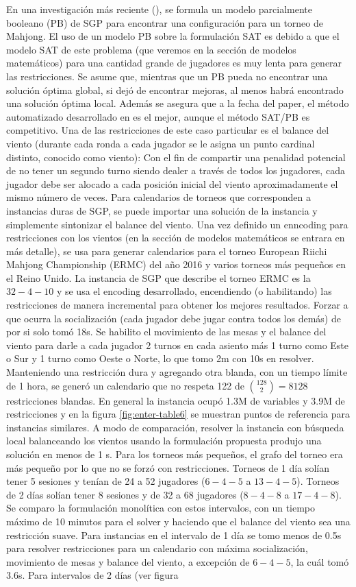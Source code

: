 \documentclass[letter, 10pt]{article}
\begin{document}
En una investigación más reciente (\cite{lester21pb}), se formula un modelo parcialmente booleano (PB) de SGP para encontrar una configuración para un torneo de Mahjong. El uso de un modelo PB sobre la formulación SAT es debido a que el modelo SAT de este problema (que veremos en la sección de modelos matemáticos) para una cantidad grande de jugadores es muy lenta para generar las restricciones. Se asume que, mientras que un PB pueda no encontrar una solución óptima global, si dejó de encontrar mejoras, al menos habrá encontrado una solución óptima local. Además se asegura que a la fecha del paper, el método automatizado desarrollado en \cite{triska2012effective} es el mejor, aunque el método SAT/PB es competitivo. Una de las restricciones de este caso particular es el balance del viento (durante cada ronda a cada jugador se le asigna un punto cardinal distinto, conocido como viento): Con el fin de compartir una penalidad potencial de no tener un segundo turno siendo dealer a través de todos los jugadores, cada jugador debe ser alocado a cada posición inicial del viento aproximadamente el mismo número de veces. Para calendarios de torneos que corresponden a instancias duras de SGP, se puede importar una solución de la instancia y simplemente sintonizar el balance del viento. Una vez definido un enncoding para restricciones con los vientos (en la sección de modelos matemáticos se entrara en más detalle), se usa para generar calendarios para el torneo European Riichi Mahjong Championship (ERMC) del año 2016 y varios torneos más pequeños en el Reino Unido. La instancia de SGP que describe el torneo ERMC es la $32-4-10$ y se usa el encoding desarrollado, encendiendo (o habilitando) las restricciones de manera incremental para obtener los mejores resultados. Forzar a que ocurra la socialización (cada jugador debe jugar contra todos los demás) de por si solo tomó 18s. Se habilito el movimiento de las mesas y el balance del viento para darle a cada jugador 2 turnos en cada asiento más 1 turno como Este o Sur y 1 turno como Oeste o Norte, lo que tomo 2m con 10s en resolver. Manteniendo una restricción dura y agregando otra blanda, con un tiempo límite de 1 hora, se generó un calendario que no respeta 122 de $\binom{128}{2}=8128$ restricciones blandas. En general la instancia ocupó 1.3M de variables y 3.9M de restricciones y en la figura \ref{fig:enter-table6} se muestran puntos de referencia para instancias similares. A modo de comparación, resolver la instancia con búsqueda local balanceando los vientos usando la formulación propuesta produjo una solución en menos de 1 s. Para los torneos más pequeños, el grafo del torneo era más pequeño por lo que no se forzó con restricciones. Torneos de 1 día solían tener 5 sesiones y tenían de 24 a 52 jugadores ($6-4-5$ a $13-4-5$). Torneos de 2 días solían tener 8 sesiones y de 32 a 68 jugadores ($8-4-8$ a $17-4-8$). Se comparo la formulación monolítica con estos intervalos, con un tiempo máximo de 10 minutos para el solver y haciendo que el balance del viento sea una restricción suave. Para instancias en el intervalo de 1 día se tomo menos de 0.5s para resolver restricciones para un calendario con máxima socialización, movimiento de mesas y balance del viento, a excepción de $6-4-5$, la cuál tomó 3.6s. Para intervalos de 2 días (ver figura 
\end{document}
